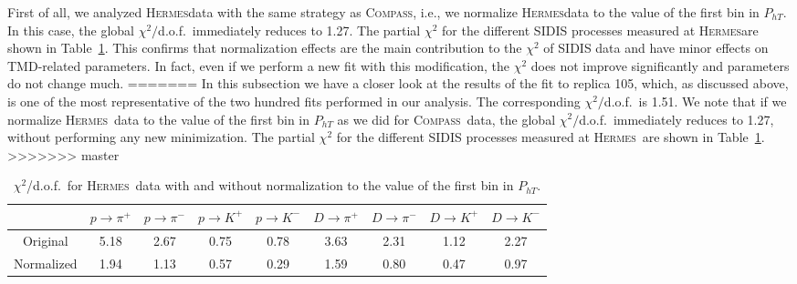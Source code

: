 \documentclass[aps,preprintnumbers,showpacs,nofootinbib,superscriptaddress,floatfix]{revtex4}
\newcommand{\hermes}{\textsc{Hermes}}
\newcommand{\compass}{\textsc{Compass}}
\begin{document}
First of all, we analyzed \hermes data with the same strategy as \compass,
i.e., we normalize \hermes data to the value of the first bin
in $P_{hT}$. In this case, the global
$\chi^2/$d.o.f.~immediately reduces to 1.27. The partial $\chi^2$ for the
different SIDIS processes measured 
at \hermes are shown in Table~\ref{t:replica105-hermes}. 
This confirms that normalization effects are the main contribution to the
$\chi^2$ of SIDIS data and have minor effects on TMD-related parameters. In
fact, even if we perform a new fit with this modification, the $\chi^2$ does
not improve significantly and parameters do not change much.
=======
In this subsection we have a closer look at the results of the fit to replica 105, which, as discussed above, is one of the most representative of the two hundred fits performed in our analysis. The corresponding $\chi^2/$d.o.f.~is 1.51. We note that if we normalize \hermes\ data to the value of the first bin in $P_{hT}$ as we did for \compass\ data, the global  $\chi^2/$d.o.f.~immediately reduces to 1.27, without performing any new minimization. The partial $\chi^2$ for the different SIDIS processes measured at \hermes\ are shown in Table~\ref{t:replica105-hermes}.
>>>>>>> master

\begin{table}[h!]
\begin{center}
\begin{tabular}{|c|c|c|c|c|c|c|c|c|}
 \hline
\hline
 ~     &  $p \to \pi^+$    &   $p \to \pi^-$    &  $p \to K^+$    &   $p \to K^-$       &  $D \to \pi^+$    &   $D \to \pi^-$    &  $D \to K^+$    &   $D \to K^-$                \\
\hline
 Original   &  5.18 &  2.67 & 0.75  & 0.78      &  3.63 &  2.31 & 1.12  & 2.27    \\
 \hline
Normalized  &  1.94 &  1.13 &  0.57 & 0.29 & 1.59  & 0.80 & 0.47 & 0.97  \\            
 \hline
 \hline
\end{tabular}
\caption{$\chi^2$/d.o.f.\ for \hermes\ data with and without normalization to the value of the first bin in $P_{hT}$.} 
\label{t:replica105-hermes}
\end{center}
\end{table}
\end{document}
